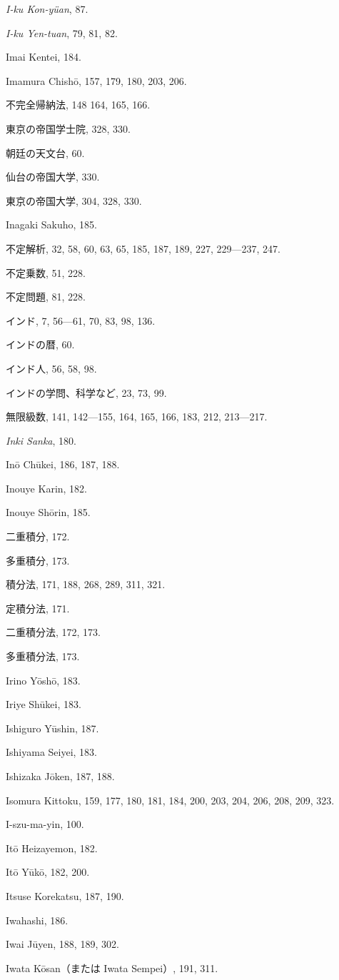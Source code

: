 \documentclass[11pt]{article}
\begin{document}
\emph{I-ku Kon-yüan}, 87.\par
\emph{I-ku Yen-tuan}, 79, 81, 82.\par
Imai Kentei, 184.\par
Imamura Chishō, 157, 179, 180, 203, 206.\par
不完全帰納法, 148 164, 165, 166.\par
東京の帝国学士院, 328, 330.\par
朝廷の天文台, 60.\par
仙台の帝国大学, 330.\par
東京の帝国大学, 304, 328, 330.\par
Inagaki Sakuho, 185.\par
不定解析, 32, 58, 60, 63, 65, 185, 187, 189, 227, 229—237, 247.\par
不定乗数, 51, 228.\par
不定問題, 81, 228.\par
インド, 7, 56—61, 70, 83, 98, 136.\par
インドの暦, 60.\par
インド人, 56, 58, 98.\par
インドの学問、科学など, 23, 73, 99.\par
無限級数, 141, 142—155, 164, 165, 166, 183, 212, 213—217.\par
\emph{Inki Sanka}, 180.\par
Inō Chūkei, 186, 187, 188.\par
Inouye Karin, 182.\par
Inouye Shōrin, 185.\par
二重積分, 172.\par
多重積分, 173.\par
積分法, 171, 188, 268, 289, 311, 321.\par
定積分法, 171.\par
二重積分法, 172, 173.\par
多重積分法, 173.\par
Irino Yōshō, 183.\par
Iriye Shūkei, 183.\par
Ishiguro Yūshin, 187.\par
Ishiyama Seiyei, 183.\par
Ishizaka Jōken, 187, 188.\par
Isomura Kittoku, 159, 177, 180, 181, 184, 200, 203, 204, 206, 208, 209, 323.\par
I-szu-ma-yin, 100.\par
Itō Heizayemon, 182.\par
Itō Yūkō, 182, 200.\par
Itsuse Korekatsu, 187, 190.\par
Iwahashi, 186.\par
Iwai Jūyen, 188, 189, 302.\par
Iwata Kōsan（または Iwata Sempei）, 191, 311.\par
\end{document}

